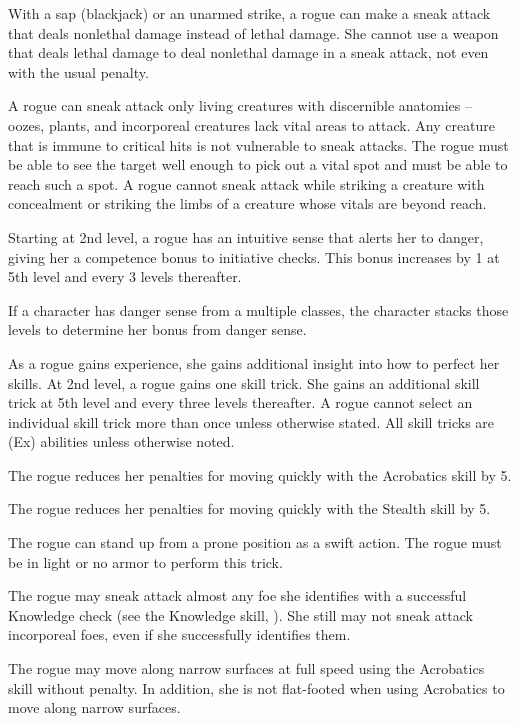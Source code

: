 With a sap (blackjack) or an unarmed strike, a rogue can make a sneak attack that deals nonlethal damage instead of lethal damage. She cannot use a weapon that deals lethal damage to deal nonlethal damage in a sneak attack, not even with the usual  penalty.

A rogue can sneak attack only living creatures with discernible anatomies -- oozes, plants, and incorporeal creatures lack vital areas to attack. Any creature that is immune to critical hits is not vulnerable to sneak attacks. The rogue must be able to see the target well enough to pick out a vital spot and must be able to reach such a spot. A rogue cannot sneak attack while striking a creature with concealment or striking the limbs of a creature whose vitals are beyond reach.

 Starting at 2nd level, a rogue has an intuitive sense that alerts her to danger, giving her a  competence bonus to initiative checks. This bonus increases by 1 at 5th level and every 3 levels thereafter.
\par If a character has danger sense from a multiple classes, the character stacks those levels to determine her bonus from danger sense.

 As a rogue gains experience, she gains additional insight into how to perfect her skills. At 2nd level, a rogue gains one skill trick. She gains an additional skill trick at 5th level and every three levels thereafter. A rogue cannot select an individual skill trick more than once unless otherwise stated. All skill tricks are (Ex) abilities unless otherwise noted.

 The rogue reduces her penalties for moving quickly with the Acrobatics skill by 5.

 The rogue reduces her penalties for moving quickly with the Stealth skill by 5.

 The rogue can stand up from a prone position as a swift action. The rogue must be in light or no armor to perform this trick.

 The rogue may sneak attack almost any foe she identifies with a successful Knowledge check (see the Knowledge skill, ). She still may not sneak attack incorporeal foes, even if she successfully identifies them.

 The rogue may move along narrow surfaces at full speed using the Acrobatics skill without penalty. In addition, she is not flat-footed when using Acrobatics to move along narrow surfaces.

